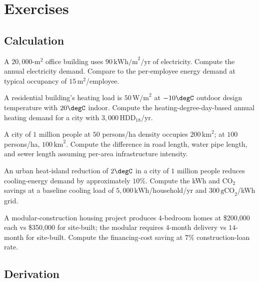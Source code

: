 \section{Exercises}

\subsection*{Calculation}

\begin{exercise}
A $20{,}000$-m$^2$ office building uses $90\,\text{kWh/m}^2/\text{yr}$ of electricity. Compute the annual electricity demand. Compare to the per-employee energy demand at typical occupancy of $15\,\text{m}^2$/employee.
\end{exercise}

\begin{exercise}
A residential building's heating load is $50\,\text{W/m}^2$ at $-10\degC$ outdoor design temperature with $20\degC$ indoor. Compute the heating-degree-day-based annual heating demand for a city with $3{,}000\,\text{HDD}_{18}$/yr.
\end{exercise}

\begin{exercise}
A city of $1$ million people at $50$ persons/ha density occupies $200\,\text{km}^2$; at $100$ persons/ha, $100\,\text{km}^2$. Compute the difference in road length, water pipe length, and sewer length assuming per-area infrastructure intensity.
\end{exercise}

\begin{exercise}
An urban heat-island reduction of $2\degC$ in a city of $1$ million people reduces cooling-energy demand by approximately $10\%$. Compute the kWh and CO$_2$ savings at a baseline cooling load of $5{,}000\,\text{kWh}$/household/yr and $300\,\text{gCO}_2$/kWh grid.
\end{exercise}

\begin{exercise}
A modular-construction housing project produces $4$-bedroom homes at \$200{,}000 each vs \$350{,}000 for site-built; the modular requires $4$-month delivery vs $14$-month for site-built. Compute the financing-cost saving at $7\%$ construction-loan rate.
\end{exercise}

\subsection*{Derivation}

